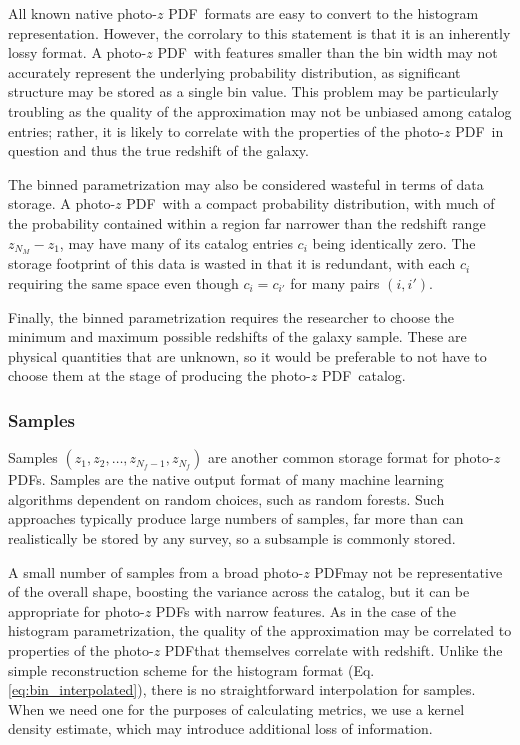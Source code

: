 \documentclass[\docopts]{\docclass}
\newcommand{\pz}{photo-$z$ PDF}
\begin{document}
All known native \pz\ formats are easy to convert to the histogram 
representation.  However, the corrolary to this statement is that it is an 
inherently lossy format.  A \pz\ with features smaller than the bin width may 
not accurately represent the underlying probability distribution, as 
significant structure may be stored as a single bin value.  This problem may be 
particularly troubling as the quality of the approximation may not be unbiased 
among catalog entries; rather, it is likely to correlate with the properties of 
the \pz\ in question and thus the true redshift of the galaxy.

The binned parametrization may also be considered wasteful in terms of data 
storage.  A \pz\ with a compact probability distribution, with much of the 
probability contained within a region far narrower than the redshift range 
$z_{N_{M}} - z_{1}$, may have many of its catalog entries $c_{i}$ being 
identically zero.  The storage footprint of this data is wasted in that it is 
redundant, with each $c_{i}$ requiring the same space even though 
$c_{i}=c_{i'}$ for many pairs $(i, i')$.

Finally, the binned parametrization requires the researcher to choose the 
minimum and maximum possible redshifts of the galaxy sample.  These are 
physical quantities that are unknown, so it would be preferable to not have to 
choose them at the stage of producing the \pz\ catalog.

\subsubsection{Samples}
\label{sec:samples}

Samples $(z_{1}, z_{2}, \dots, z_{N_{f}-1}, z_{N_{f}})$ are another common 
storage format for \pz s.  Samples are the native output format of many machine 
learning algorithms dependent on random choices, such as random forests.  Such 
approaches typically produce large numbers of samples, far more than can 
realistically be stored by any survey, so a subsample is commonly stored.  

A small number of samples from a broad \pz may not be representative of the 
overall shape, boosting the variance across the catalog, but it can be 
appropriate for \pz s with narrow features.  As in the case of the histogram 
parametrization, the quality of the approximation may be correlated to 
properties of the \pz that themselves correlate with redshift.  Unlike the 
simple reconstruction scheme for the histogram format (Eq. 
\ref{eq:bin_interpolated}), there is no straightforward interpolation for 
samples.  When we need one for the purposes of calculating metrics, we use a 
kernel density estimate, which may introduce additional loss of information.  
\end{document}
